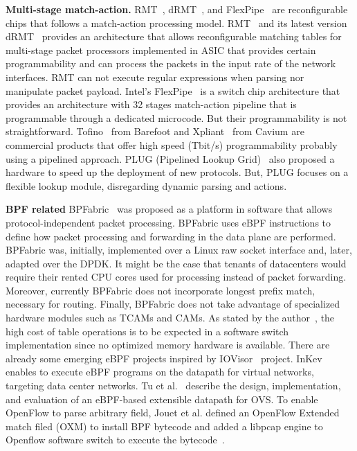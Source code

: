 \textbf{Multi-stage match-action.} RMT~\cite{bosshart2013forwarding}, dRMT~\cite{chole2017drmt}, and FlexPipe~\cite{FlexPipe2012} are reconfigurable chips that follows a match-action processing model.
RMT~\cite{bosshart2013forwarding} and its latest version dRMT~\cite{chole2017drmt} provides an architecture that allows reconfigurable matching tables for multi-stage packet processors implemented in ASIC that provides certain programmability and can process the packets in the input rate of the network interfaces. RMT can not execute regular expressions when parsing nor manipulate packet payload. Intel's FlexPipe~\cite{FlexPipe2012} is a switch chip architecture that provides an architecture with 32 stages match-action pipeline that is programmable through a dedicated microcode. But their programmability is not straightforward. Tofino~\cite{barefoot-tofino} from Barefoot and Xpliant~\cite{cavium1,cavium2} from Cavium are commercial products that offer high speed (Tbit/s) programmability probably using a pipelined approach.
PLUG (Pipelined Lookup Grid)~\cite{DeCarli:2009:PFL:1592568.1592593} also proposed a hardware to speed up the deployment of new protocols. But, PLUG focuses on a flexible lookup module, disregarding dynamic parsing and actions. 




\textbf{BPF related} BPFabric~\cite{Jouet:2017:BPFabric} was proposed as a platform in software that allows protocol-independent packet processing. 
BPFabric uses eBPF instructions to define how packet processing and forwarding in the data plane are performed.
BPFabric was, initially, implemented over a Linux raw socket interface and, later, adapted over the DPDK.
It might be the case that tenants of datacenters would require their rented CPU cores used for processing instead of packet forwarding. Moreover, currently BPFabric does not incorporate longest prefix match, necessary for routing. Finally, BPFabric does not take advantage of specialized  hardware modules such as TCAMs and CAMs.
As stated by the author~\cite{Jouet2017Thesis}, the high cost of table operations is to be expected in a software switch implementation
since no optimized memory hardware is available. 
There  are  already some emerging eBPF projects inspired by IOVisor~\cite{IOvisor} project.
InKev~\cite{InKeV2016} enables to execute eBPF programs on the datapath for virtual networks, targeting data center networks.
Tu et al.~\cite{Tu:2017:BEO:3139645.3139657} describe the design, implementation, and evaluation of an eBPF-based extensible datapath for OVS.
To enable OpenFlow to parse arbitrary field, Jouet et al. defined an OpenFlow Extended match filed (OXM) to install BPF bytecode and added a libpcap engine to Openflow software switch to execute the bytecode~\cite{Jouet2015OpenFlow}.

